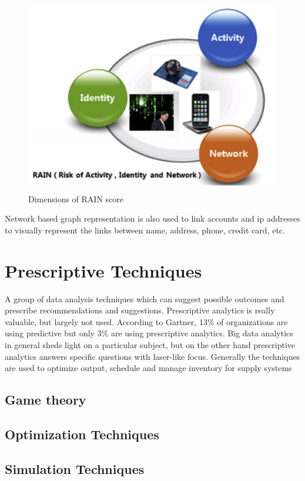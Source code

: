 \begin{figure}[H]
	\includegraphics[scale = 0.8]{figures/RAIN_dimension.png}
	\centering
	\caption{Dimensions of RAIN score}
	\label{fig:rain_dimension}
\end{figure}

Network based graph representation is also used to link accounts and ip addresses to visually represent the links between name, address, phone, credit card, etc.

\chapter{Prescriptive Techniques}
\label{prescriptive-techniques}

A group of data analysis techniques which can suggest possible outcomes and prescribe recommendations and suggestions.
Prescriptive analytics is really valuable, but largely not used. According to Gartner, 13\% of organizations are using predictive but only 3\% are using prescriptive analytics. 
Big data analytics in general sheds light on a particular subject, but on the other hand prescriptive analytics answers specific questions with laser-like focus. 
Generally the techniques are used to optimize output, schedule and manage inventory for supply systems

\section{Game theory}

%
%
%
%

\setlength{\footskip}{8mm}

\section{Optimization Techniques} 
\label{optimization-techniques}





%
%
%
%

\setlength{\footskip}{8mm}

\section{Simulation Techniques} 
\label{visualization-techniques}





%
%
%
%

\setlength{\footskip}{8mm}

